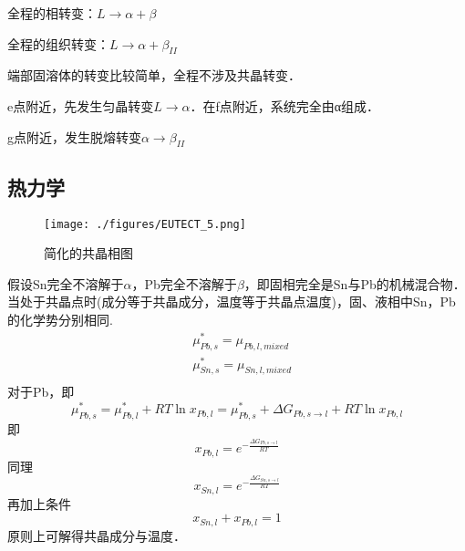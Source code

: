 全程的相转变：$L \rightarrow \alpha+\beta$

全程的组织转变：$L \rightarrow \alpha+ \beta_{II}$

端部固溶体的转变比较简单，全程不涉及共晶转变．

e点附近，先发生匀晶转变$L \rightarrow \alpha$．在f点附近，系统完全由α组成．

g点附近，发生脱熔转变$\alpha \rightarrow \beta_{II}$

\subsection{热力学}
\begin{figure}[ht]
\centering
\texttt{[image: ./figures/EUTECT\_5.png]}
\caption{简化的共晶相图} \label{EUTECT_fig5}
\end{figure}
假设Sn完全不溶解于$\alpha$，Pb完全不溶解于$\beta$，即固相完全是Sn与Pb的机械混合物．当处于共晶点时(成分等于共晶成分，温度等于共晶点温度)，固、液相中Sn，Pb的化学势分别相同.
\begin{align}
&\mu_{Pb,s}^*=\mu_{Pb,l,mixed}\\
&\mu_{Sn,s}^*=\mu_{Sn,l,mixed}\\
\end{align}
对于Pb，即
$$\mu_{Pb,s}^*=\mu_{Pb,l}^*+RT \ln x_{Pb,l}=\mu_{Pb,s}^*+\Delta G_{Pb, s\rightarrow l}+RT \ln x_{Pb,l}$$
即
\begin{equation}
x_{Pb,l}=e^{-\frac{\Delta G_{Pb, s\rightarrow l}}{RT}}
\end{equation}
同理
\begin{equation}
x_{Sn,l}=e^{-\frac{\Delta G_{Sn, s\rightarrow l}}{RT}}
\end{equation}
再加上条件
\begin{equation}
x_{Sn,l}+x_{Pb,l}=1
\end{equation}
原则上可解得共晶成分与温度．
